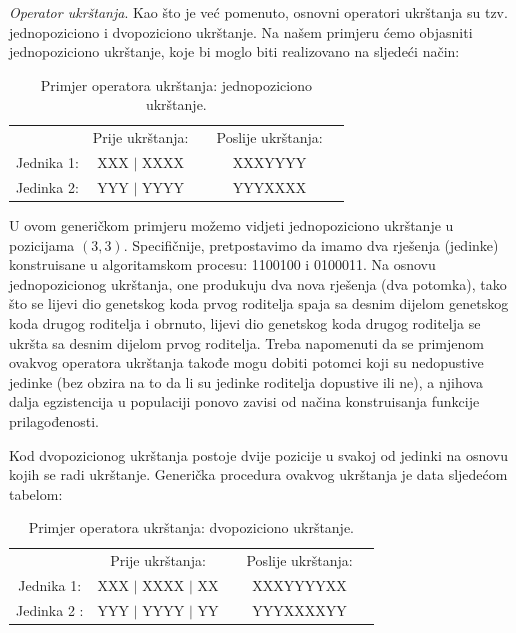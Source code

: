 \documentclass[a4paper, utf8, 11pt, colorlinks]{book}
\theoremstyle{definition}
\begin{document}
\emph{Operator ukrštanja}. Kao što je već pomenuto, osnovni operatori ukrštanja su tzv. jednopoziciono i dvopoziciono ukrštanje. Na našem primjeru ćemo objasniti  jednopoziciono ukrštanje, koje bi moglo biti realizovano na sljedeći način:
\begin{table}[H]
	\centering

\begin{tabular}{ccccc}
              &	Prije ukrštanja: &    &  Poslije ukrštanja:   \\
   Jednika 1: &	XXX $\mid$ XXXX  &    &   XXXYYYY             \\
   Jedinka 2:&	YYY $\mid$ YYYY  &    &   YYYXXXX             \\
\end{tabular}
	\caption{Primjer operatora ukrštanja: jednopoziciono ukrštanje.}
\end{table}
U ovom generičkom primjeru možemo vidjeti jednopoziciono ukrštanje u pozicijama $(3, 3).$  Specifičnije, pretpostavimo da imamo dva rješenja (jedinke) konstruisane u algoritamskom procesu: 1100100 i 0100011. Na osnovu jednopozicionog ukrštanja, one produkuju dva nova rješenja (dva potomka), tako što se lijevi dio genetskog koda prvog roditelja spaja sa desnim dijelom genetskog koda drugog roditelja i obrnuto, lijevi dio genetskog koda drugog roditelja se ukršta sa desnim dijelom prvog roditelja. 
Treba napomenuti da se primjenom ovakvog operatora ukrštanja takođe mogu dobiti potomci koji su nedopustive jedinke (bez obzira na to da li su jedinke roditelja dopustive ili ne), a njihova dalja egzistencija u populaciji ponovo zavisi od načina konstruisanja funkcije prilagođenosti. 

Kod dvopozicionog ukrštanja postoje dvije pozicije u svakoj od jedinki na osnovu kojih se radi ukrštanje. Generička procedura ovakvog ukrštanja je data sljedećom tabelom: 
\begin{table}[H]
	\centering
	
	\begin{tabular}{ccccc}
		&	Prije ukrštanja: &    &  Poslije ukrštanja:                         \\
		Jednika 1: &	XXX $\mid$ XXXX $\mid$ XX  &    &   XXXYYYYXX             \\
		Jedinka 2 :&	YYY $\mid$ YYYY $\mid$ YY  &    &   YYYXXXXYY             \\
	\end{tabular}
	\caption{Primjer operatora ukrštanja: dvopoziciono ukrštanje.}
\end{table}
\end{document}
